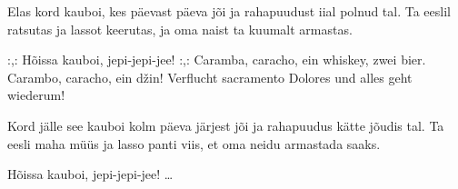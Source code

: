 Elas kord kauboi, kes p\"aevast p\"aeva j\~oi
ja rahapuudust iial polnud tal.
Ta eeslil ratsutas ja lassot keerutas,
ja oma naist ta kuumalt armastas.

:,: H\~oissa kauboi, jepi-jepi-jee! :,:
Caramba, caracho,
ein whiskey, zwei bier.
Carambo, caracho, ein d\v{z}in!
Verflucht sacramento Dolores
und alles geht wiederum!

Kord j\"alle see kauboi kolm p\"aeva j\"arjest j\~oi
ja rahapuudus k\"atte j\~oudis tal.
Ta eesli maha m\"u\"us ja lasso panti viis,
et oma neidu armastada saaks.

H\~oissa kauboi, jepi-jepi-jee! \ldots